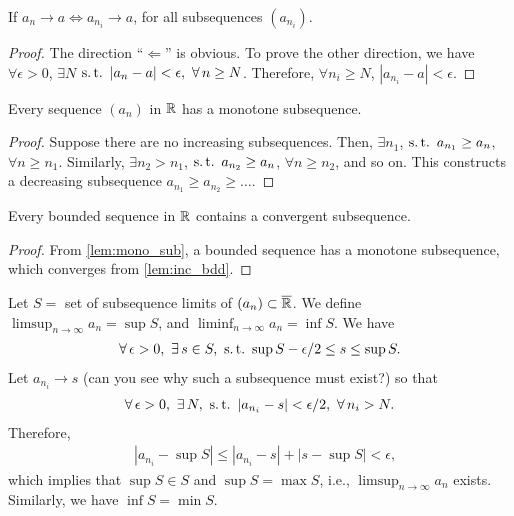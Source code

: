 \documentclass[12pt]{article}
\begin{document}
\begin{Lemma}\label{wk1:subseq}
If $a_n \to a \iff a_{n_i} \to a$, for all subsequences $(a_{n_i})$.
\end{Lemma}
\begin{proof}
The direction ``$\Leftarrow$'' is obvious. To prove the other direction, we have $\forall \epsilon > 0$, $\exists N$ $\st |a_n - a| < \epsilon,\ \forall n \geq N$. Therefore, $\forall n_i \geq N$, $|a_{n_i} - a| < \epsilon$.
\end{proof}

\begin{Lemma}\label{lem:mono_sub} 
Every sequence $(a_n)$ in $\mathbb{R}$ has a monotone subsequence.
\end{Lemma}
\begin{proof}
Suppose there are no increasing subsequences. Then, $\exists n_1$, $\st a_{n_1} \geq a_n$, $\forall n \geq n_1$. Similarly, $\exists n_2 > n_1$, $\st a_{n_2} \geq a_n$, $\forall n \geq n_2$, and so on. This constructs a decreasing subsequence $a_{n_1} \geq a_{n_2} \geq \ldots$. 
\end{proof}

\begin{Lemma}\label{lem:bdd_conv}
Every bounded sequence in $\mathbb{R}$ contains a convergent subsequence.
\end{Lemma}
\begin{proof}
From \cref{lem:mono_sub}, a bounded sequence has a monotone subsequence, which converges from \cref{lem:inc_bdd}.
\end{proof}

Let $S =$ set of subsequence limits of $(a_n) \subset \overline{\mathbb{R}}$. We define $\limsup_{n \to \infty} {a_n}=\sup{S}$, and $\liminf_{n \to \infty}{a_n}=\inf{S}$. We have
\begin{align*}
\forall \epsilon > 0,\ \exists s \in S,\ \st \sup{S} - \epsilon/2 \leq s \leq \sup{S}.
\end{align*}
Let $a_{n_i} \to s$ (can you see why such a subsequence must exist?) so that
\begin{align*}
\forall \epsilon > 0,\ \exists N,\ \st |a_{n_i} - s| < \epsilon/2,\ \forall n_i > N.
\end{align*}
Therefore,
\begin{align*}
&|a_{n_i} - \sup{S}| \leq |a_{n_i} - s| + |s - \sup{S}| < \epsilon,
\end{align*}
which implies that $\sup{S} \in S$ and $\sup{S} = \max{S}$, i.e., $\limsup_{n\to\infty} a_n$ exists. Similarly, we have $\inf{S} = \min{S}$.
\end{document}
